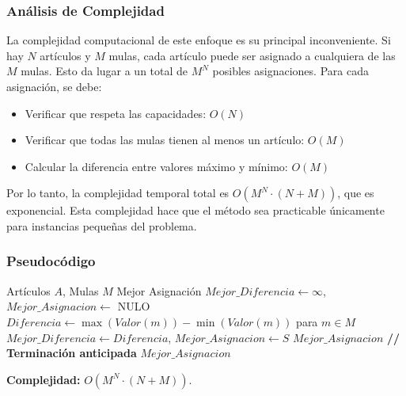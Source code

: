 \documentclass[12pt, a4paper]{article}
\begin{document}
    \subsubsection{Análisis de Complejidad}
    La complejidad computacional de este enfoque es su principal inconveniente. Si hay $N$ artículos y $M$ mulas, cada artículo puede ser asignado a cualquiera de las $M$ mulas. Esto da lugar a un total de $M^N$ posibles asignaciones. Para cada asignación, se debe:
    \begin{itemize}
        \item Verificar que respeta las capacidades: $O(N)$
        \item Verificar que todas las mulas tienen al menos un artículo: $O(M)$
        \item Calcular la diferencia entre valores máximo y mínimo: $O(M)$
    \end{itemize}
    Por lo tanto, la complejidad temporal total es $O(M^N \cdot (N + M))$, que es exponencial. Esta complejidad hace que el método sea practicable únicamente para instancias pequeñas del problema.

    \subsubsection{Pseudocódigo}
    \begin{algorithm}[H]
        \caption{Fuerza Bruta para Transporte Discreto}
        \begin{algorithmic}[1]
            \Require Artículos $A$, Mulas $M$
            \Ensure Mejor Asignación
            \State $Mejor\_Diferencia \gets \infty$, $Mejor\_Asignacion \gets$ NULO
                    \State $Diferencia \gets \max(Valor(m)) - \min(Valor(m))$ para $m \in M$
                        \State $Mejor\_Diferencia \gets Diferencia$, $Mejor\_Asignacion \gets S$
                            \State \Return $Mejor\_Asignacion$ \textbf{// Terminación anticipada}
                        \EndIf
                    \EndIf
                \EndIf
            \EndFor
            \State \Return $Mejor\_Asignacion$
        \end{algorithmic}
    \end{algorithm}
    \textbf{Complejidad:} $O(M^N \cdot (N + M))$.
\end{document}
